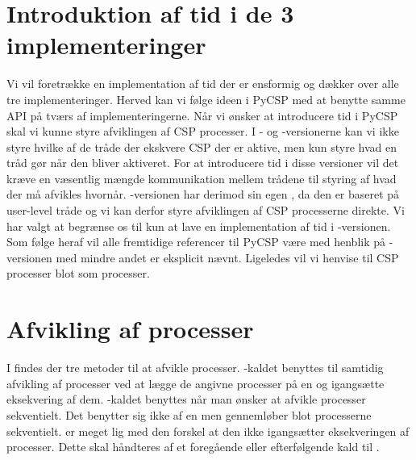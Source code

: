 \section{Introduktion af tid i de 3 implementeringer}
Vi vil foretrække en implementation af tid der er ensformig og dækker over alle tre implementeringer. Herved kan vi følge ideen i PyCSP med at benytte samme API på tværs af implementeringerne. Når vi ønsker at introducere tid i PyCSP skal vi kunne styre afviklingen af CSP processer. I  - og -versionerne kan vi ikke styre hvilke af de tråde der ekskvere CSP der er aktive, men kun styre hvad en tråd gør når den bliver aktiveret. For at introducere tid i disse versioner vil det kræve en væsentlig mængde kommunikation mellem trådene til styring af hvad der må afvikles hvornår. -versionen har derimod sin egen \sched , da den er baseret på user-level tråde og vi kan derfor styre afviklingen af CSP processerne direkte. Vi har valgt at begrænse os til kun at lave en implementation af tid i -versionen. Som følge heraf vil alle fremtidige referencer til PyCSP være med henblik på -versionen med mindre andet er eksplicit nævnt. Ligeledes vil vi henvise til CSP processer blot som processer. 

\section{Afvikling af processer}
I \pycsp findes der tre metoder til at afvikle processer. -kaldet benyttes til samtidig afvikling af processer ved at lægge de angivne processer på \sched en og igangsætte eksekvering af dem. -kaldet benyttes når man ønsker at afvikle processer sekventielt. Det benytter sig ikke af \sched en men gennemløber blot processerne sekventielt.  er meget lig  med den forskel at den ikke igangsætter eksekveringen af processer. Dette skal håndteres af et foregående eller efterfølgende kald til . 


